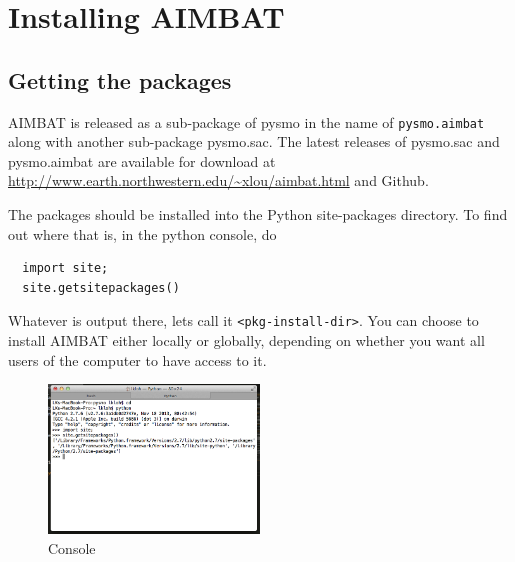 \documentclass[letterpaper,10pt]{article}
\begin{document}



\section{Installing AIMBAT}


\subsection{Getting the packages}

AIMBAT is released as a sub-package of pysmo in the name of \verb"pysmo.aimbat" along with
another sub-package pysmo.sac. The latest releases of pysmo.sac and pysmo.aimbat are
available for download at \url{http://www.earth.northwestern.edu/~xlou/aimbat.html} and Github. 

The packages should be installed into the Python site-packages directory. To find out where that is, in the python console, do

\begin{verbatim}
  import site;
  site.getsitepackages()
\end{verbatim}

Whatever is output there, lets call it \verb"<pkg-install-dir>". You can choose to install AIMBAT either locally or globally, depending on whether you want all users of the computer to have access to it.

\begin{figure}[h!]
  \centering
  \includegraphics[width=0.5\textwidth]{images/site_package_location}
  \caption{Console}
  \label{fig:site_package_location}
\end{figure}
\end{document}
